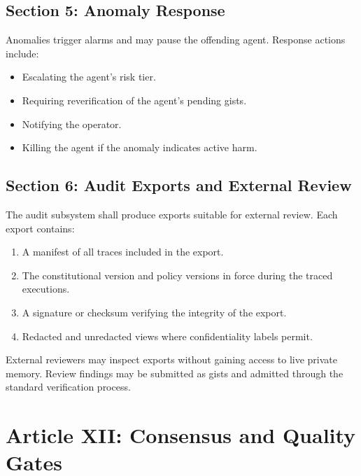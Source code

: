 \documentclass[12pt,letterpaper]{article}
\begin{document}
\subsection{Section 5: Anomaly Response}

Anomalies trigger alarms and may pause the offending agent. Response actions include:

\begin{itemize}
    \item Escalating the agent's risk tier.
    \item Requiring reverification of the agent's pending gists.
    \item Notifying the operator.
    \item Killing the agent if the anomaly indicates active harm.
\end{itemize}

\subsection{Section 6: Audit Exports and External Review}

The audit subsystem shall produce exports suitable for external review. Each export contains:

\begin{enumerate}
    \item A manifest of all traces included in the export.
    \item The constitutional version and policy versions in force during the traced executions.
    \item A signature or checksum verifying the integrity of the export.
    \item Redacted and unredacted views where confidentiality labels permit.
\end{enumerate}

External reviewers may inspect exports without gaining access to live private memory. Review findings may be submitted as gists and admitted through the standard verification process.

\section{Article XII: Consensus and Quality Gates}
\label{art:consensus}
\end{document}
